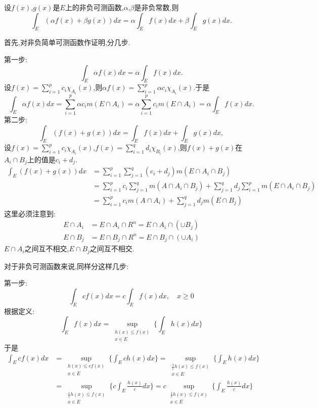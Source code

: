 \documentclass[12pt,a4paper,openany]{book}
\begin{document}
设$f(x)$,$g(x)$是$E$上的非负可测函数,$\alpha$,$\beta$是非负常数,则
\[
\int_{E}{(\alpha{f(x)} + \beta{g(x)})dx} = \alpha\int_{E}{f(x)dx} + \beta\int_{E}{g(x)dx}.
\]

首先,对非负简单可测函数作证明,分几步.

第一步:
\[
\int_{E}{\alpha{f(x)}dx} = \alpha\int_{E}{f(x)dx}.
\]
设$f(x)=\sum_{i=1}^{p}{c_i\chi_{A_i}(x)}$,则$\alpha{f(x)}=\sum_{i=1}^{p}{\alpha{c_i}\chi_{A_i}(x)}$.于是
\[
\int_{E}{\alpha{f(x)}dx} = \sum_{i=1}^{p}{\alpha{}c_im(E \cap A_i)}=\alpha\sum_{i=1}^{p}{c_im(E \cap A_i)}=\alpha\int_{E}{f(x)dx}.
\]
第二步:
\[
\int_{E}{(f(x)+g(x))dx} = \int_{E}{f(x)dx} + \int_{E}{g(x)dx},
\]
设$f(x)=\sum_{i=1}^{p}{c_i\chi_{A_i}(x)}$,$f(x)=\sum_{i=1}^{q}{d_i\chi_{B_i}(x)}$,则$f(x)+g(x)$在$A_i \cap B_j$上的值是$c_i+d_j$.
\[
\begin{aligned}
\int_{E}{(f(x)+g(x))dx}&=\sum_{i=1}^{p}{\sum_{j=1}^{q}{(c_i+d_j)m(E \cap A_i \cap B_j)}} \\
&= \sum_{i=1}^{p}{c_i\sum_{j=1}^{q}{m(A \cap A_i \cap B_j)}} + \sum_{j=1}^{q}{d_j\sum_{i=1}^{p}{m(E \cap A_i \cap B_j)}} \\
&= \sum_{i=1}^{p}{c_im(A \cap A_i)} + \sum_{j=1}^{q}{d_jm(E \cap B_j)}
\end{aligned}
\]
这里必须注意到:
\[
\begin{aligned}
E \cap A_i &= E \cap A_i \cap R^n = E \cap A_i \cap (\cup{B_j})\\
E \cap B_j &= E \cap B_j \cap R^n = E \cap B_j \cap (\cup{A_i})
\end{aligned}
\]
$E \cap A_i$之间互不相交,$E \cap B_j$之间互不相交.

对于非负可测函数来说,同样分这样几步:

第一步:
\[
\int_{E}{cf(x)dx} = c\int_{E}{f(x)dx}, \quad x \ge 0
\]
根据定义:
\[
\int_{E}{f(x)dx} = \sup_{\substack{h(x) \le f(x)\\ x \in E}}{\{\int_{E}{h(x)dx}\}}
\]
于是
\[
\begin{aligned}
\int_{E}{cf(x)dx} &= \sup_{\substack{h(x) \le cf(x)\\ x \in E}}{\{\int_{E}{ch(x)dx}\}} = \sup_{\substack{\frac{1}{c}h(x) \le f(x)\\ x \in E}}{\{\int_{E}{h(x)dx}\}} \\
&= \sup_{\substack{\frac{1}{c}h(x) \le f(x)\\ x \in E}}{\{c\int_{E}{\frac{h(x)}{c}dx}\}} = c\sup_{\substack{\frac{1}{c}h(x) \le f(x)\\ x \in E}}{\{\int_{E}{\frac{h(x)}{c}dx}\}}
\end{aligned}
\]
\end{document}
